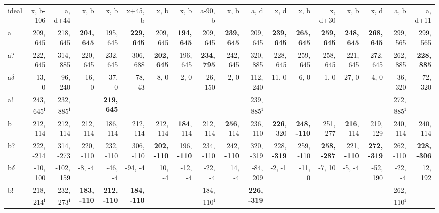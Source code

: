 \begin{table}[p]
{\begin{tabular}{lrrrrrrrrrrrrrrrrr}
ideal & x, b-106 & a, d+44 & x, b & x, b & x+45, b & x, b & x, b & a-90, b & x, b & a, d & x, d & x, b & x, d+30 & x, b & x, d & a, b & a, d+11 \\
a & 209, 645 & 218, 645 & \textbf{204, 645} & 195, 645 & \textbf{229, 645} & 209, 645 & \textbf{194, 645} & 209, 645 & \textbf{239, 645} & 209, 645 & \textbf{239, 645} & \textbf{265, 645} & \textbf{259, 645} & \textbf{248, 645} & \textbf{268, 645} & 299, 565 & 299, 565 \\
a? & 222, 645 & 314, 885 & 220, 645 & 232, 645 & 306, 688 & \textbf{202, 645} & 196, 645 & \textbf{234, 795} & 242, 645 & 320, 885 & 228, 645 & 259, 645 & 258, 645 & 221, 645 & 272, 645 & 262, 885 & \textbf{228, 885} \\
a$\delta$ & -13, 0 & -96, -240 & -16, 0 & -37, 0 & -78, -43 & 8, 0 & -2, 0 & -26, -150 & -2, 0 & -112, -240 & 11, 0 & 6, 0 & 1, 0 & 27, 0 & -4, 0 & 36, -320 & 72, -320 \\
a! & 243, 645\textsuperscript{i} & 232, 885\textsuperscript{i} &  & \textbf{219, 645} &  &  &  &  &  & 239, 885\textsuperscript{i} &  &  &  &  &  & 272, 885\textsuperscript{i} &  \\
b & 212, -114 & 212, -114 & 212, -114 & 186, -114 & 212, -114 & 212, -114 & \textbf{184}, -114 & 212, -114 & \textbf{256}, -114 & 236, -110 & \textbf{226}, -320 & \textbf{248, -110} & 251, -277 & \textbf{216}, -114 & 219, -129 & 240, -114 & 240, -114 \\
b? & 222, -214 & 314, -273 & 220, -110 & 232, -110 & 306, -110 & \textbf{202, -110} & 196, \textbf{-110} & 234, -110 & 242, \textbf{-110} & 320, -319 & 228, \textbf{-319} & 259, -110 & \textbf{258, -287} & 221, \textbf{-110} & \textbf{272, -319} & 262, -110 & \textbf{228, -306} \\
b$\delta$ & -10, 100 & -102, 159 & -8, -4 & -46, -4 & -94, -4 & 10, -4 & -12, -4 & -22, -4 & 14, -4 & -84, 209 & -2, -1 & -11, 0 & -7, 10 & -5, -4 & -52, 190 & -22, -4 & 12, 192 \\
b! & 218, -214\textsuperscript{i} & 232, -273\textsuperscript{i} & \textbf{183, -110} & \textbf{212, -110} & \textbf{184, -110} &  &  & 184, -110\textsuperscript{i} &  & \textbf{226, -319} &  &  &  &  &  & 262, -110\textsuperscript{i} &  \\

\end{tabular}}
\end{table}
